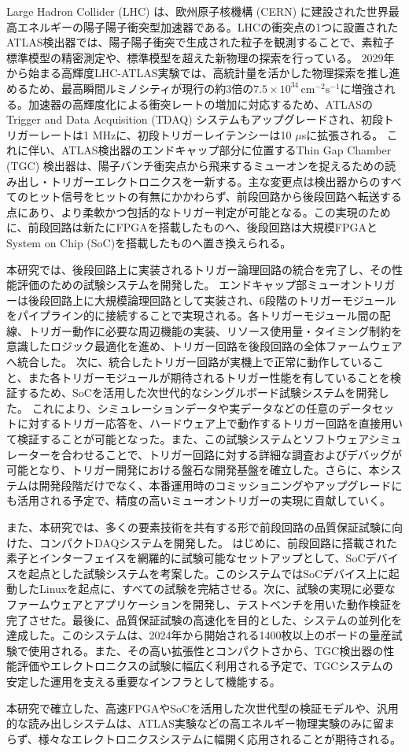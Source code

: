 Large Hadron Collider (LHC) は、欧州原子核機構 (CERN) に建設された世界最高エネルギーの陽子陽子衝突型加速器である。LHCの衝突点の1つに設置されたATLAS検出器では、陽子陽子衝突で生成された粒子を観測することで、素粒子標準模型の精密測定や、標準模型を超えた新物理の探索を行っている。
2029年から始まる高輝度LHC-ATLAS実験では、高統計量を活かした物理探索を推し進めるため、最高瞬間ルミノシティが現行の約3倍の$7.5 \times 10^{34}\, \mathrm{cm^{-2}s^{-1}}$に増強される。加速器の高輝度化による衝突レートの増加に対応するため、ATLASのTrigger and Data Acquisition (TDAQ) システムもアップグレードされ、初段トリガーレートは1 MHzに、初段トリガーレイテンシーは10 $\mu$sに拡張される。
これに伴い、ATLAS検出器のエンドキャップ部分に位置するThin Gap Chamber (TGC) 検出器は、陽子バンチ衝突点から飛来するミューオンを捉えるための読み出し・トリガーエレクトロニクスを一新する。主な変更点は検出器からのすべてのヒット信号をヒットの有無にかかわらず、前段回路から後段回路へ転送する点にあり、より柔軟かつ包括的なトリガー判定が可能となる。この実現のために、前段回路は新たにFPGAを搭載したものへ、後段回路は大規模FPGAとSystem on Chip (SoC)を搭載したものへ置き換えられる。

本研究では、後段回路上に実装されるトリガー論理回路の統合を完了し、その性能評価のための試験システムを開発した。
エンドキャップ部ミューオントリガーは後段回路上に大規模論理回路として実装され、6段階のトリガーモジュールをパイプライン的に接続することで実現される。各トリガーモジュール間の配線、トリガー動作に必要な周辺機能の実装、リソース使用量・タイミング制約を意識したロジック最適化を進め、トリガー回路を後段回路の全体ファームウェアへ統合した。
次に、統合したトリガー回路が実機上で正常に動作していること、また各トリガーモジュールが期待されるトリガー性能を有していることを検証するため、SoCを活用した次世代的なシングルボード試験システムを開発した。
これにより、シミュレーションデータや実データなどの任意のデータセットに対するトリガー応答を、ハードウェア上で動作するトリガー回路を直接用いて検証することが可能となった。また、この試験システムとソフトウェアシミュレーターを合わせることで、トリガー回路に対する詳細な調査およびデバッグが可能となり、トリガー開発における盤石な開発基盤を確立した。さらに、本システムは開発段階だけでなく、本番運用時のコミッショニングやアップグレードにも活用される予定で、精度の高いミューオントリガーの実現に貢献していく。

また、本研究では、多くの要素技術を共有する形で前段回路の品質保証試験に向けた、コンパクトDAQシステムを開発した。
はじめに、前段回路に搭載された素子とインターフェイスを網羅的に試験可能なセットアップとして、SoCデバイスを起点とした試験システムを考案した。このシステムではSoCデバイス上に起動したLinuxを起点に、すべての試験を完結させる。次に、試験の実現に必要なファームウェアとアプリケーションを開発し、テストベンチを用いた動作検証を完了させた。最後に、品質保証試験の高速化を目的とした、システムの並列化を達成した。このシステムは、2024年から開始される1400枚以上のボードの量産試験で使用される。また、その高い拡張性とコンパクトさから、TGC検出器の性能評価やエレクトロニクスの試験に幅広く利用される予定で、TGCシステムの安定した運用を支える重要なインフラとして機能する。

本研究で確立した、高速FPGAやSoCを活用した次世代型の検証モデルや、汎用的な読み出しシステムは、ATLAS実験などの高エネルギー物理実験のみに留まらず、様々なエレクトロニクスシステムに幅開く応用されることが期待される。

